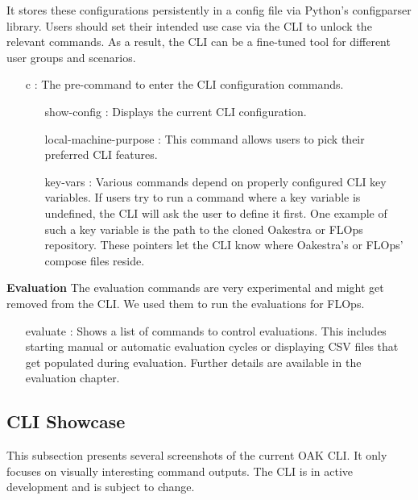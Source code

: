 It stores these configurations persistently in a config file via Python's configparser library.
Users should set their intended use case via the CLI to unlock the relevant commands.
As a result, the CLI can be a fine-tuned tool for different user groups and scenarios.
\begin{itemize}
    \item [c]:
        The pre-command to enter the CLI configuration commands.
        \begin{itemize}
            \item [show-config]:
                Displays the current CLI configuration.
            \item [local-machine-purpose]:
                This command allows users to pick their preferred CLI features.
            \item [key-vars]:
                Various commands depend on properly configured CLI key variables.
                If users try to run a command where a key variable is undefined, the CLI will ask the user to define it first.
                One example of such a key variable is the path to the cloned Oakestra or FLOps repository.
                These pointers let the CLI know where Oakestra's or FLOps' compose files reside.
        \end{itemize}
\end{itemize}
\vspace{5mm}
\textbf{Evaluation}\newline
The evaluation commands are very experimental and might get removed from the CLI.
We used them to run the evaluations for FLOps.

\begin{itemize}
    \item [evaluate]:
        Shows a list of commands to control evaluations.
        This includes starting manual or automatic evaluation cycles or displaying CSV files that get populated during evaluation.
        Further details are available in the evaluation chapter.
\end{itemize}

\subsection{CLI Showcase}

This subsection presents several screenshots of the current OAK CLI.
It only focuses on visually interesting command outputs. 
The CLI is in active development and is subject to change.

